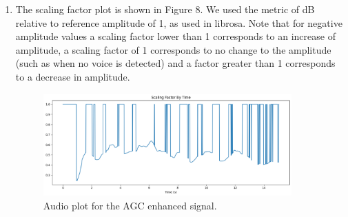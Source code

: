 \begin{enumerate}
  \item The scaling factor plot is shown in Figure 8. 
  We used the metric of dB relative to reference amplitude of 1, as used in librosa.
  Note that for negative amplitude values a scaling factor lower than 1 corresponds to an increase of amplitude, a scaling factor of 1 corresponds to no change to the amplitude (such as when no voice is detected) and a factor greater than 1 corresponds to a decrease in amplitude.
  \begin{figure}
    \label{fig:scaling_factor}
    \centering
    \includegraphics[width=0.9\textwidth]{agc_scaling_factor.png}
    \caption{Audio plot for the AGC enhanced signal.}
  \end{figure}

\end{enumerate}
